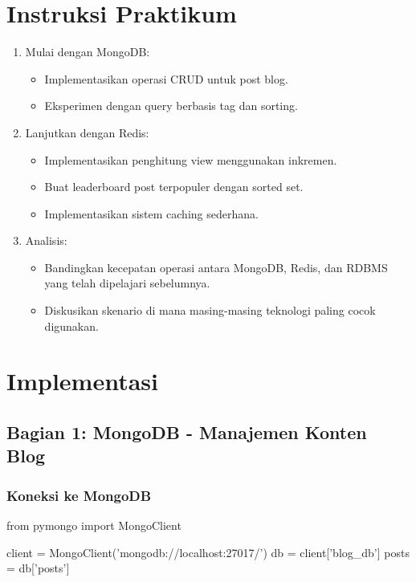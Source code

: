 \section{Instruksi Praktikum}
\begin{enumerate}
    \item Mulai dengan MongoDB:
    \begin{itemize}
        \item Implementasikan operasi CRUD untuk post blog.
        \item Eksperimen dengan query berbasis tag dan sorting.
    \end{itemize}
    \item Lanjutkan dengan Redis:
    \begin{itemize}
        \item Implementasikan penghitung view menggunakan inkremen.
        \item Buat leaderboard post terpopuler dengan sorted set.
        \item Implementasikan sistem caching sederhana.
    \end{itemize}
    \item Analisis:
    \begin{itemize}
        \item Bandingkan kecepatan operasi antara MongoDB, Redis, dan RDBMS yang telah dipelajari sebelumnya.
        \item Diskusikan skenario di mana masing-masing teknologi paling cocok digunakan.
    \end{itemize}
\end{enumerate}

\section{Implementasi}

\subsection{Bagian 1: MongoDB - Manajemen Konten Blog}

\subsubsection{Koneksi ke MongoDB}

\begin{codebox}
from pymongo import MongoClient

client = MongoClient('mongodb://localhost:27017/')
db = client['blog_db']
posts = db['posts']
\end{codebox}

